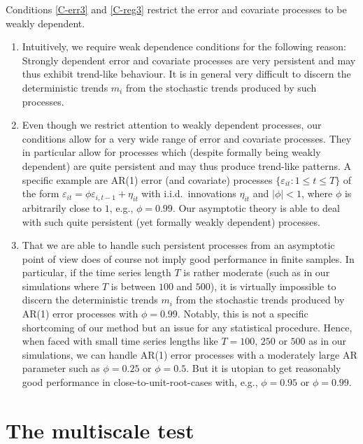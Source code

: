 \documentclass[12pt]{article}
\begin{document}
\begin{remark}
Conditions \ref{C-err3} and \ref{C-reg3} restrict the error and covariate processes to be weakly dependent.
\begin{enumerate}[label=(\roman*),leftmargin=0.9cm, itemsep=0pt, parsep=0pt, topsep=3pt]
\item Intuitively, we require weak dependence conditions for the following reason: Strongly dependent error and covariate processes are very persistent and may thus exhibit trend-like behaviour. It is in general very difficult to discern the deterministic trends $m_i$ from the stochastic trends produced by such processes.
\item Even though we restrict attention to weakly dependent processes, our conditions allow for a very wide range of error and covariate processes. They in particular allow for processes which (despite formally being weakly dependent) are quite persistent and may thus produce trend-like patterns. A specific example are AR(1) error (and covariate) processes $\{\varepsilon_{it}: 1 \le t \le T\}$ of the form $\varepsilon_{it} = \phi \varepsilon_{i,t-1} + \eta_{it}$ with i.i.d.\ innovations $\eta_{it}$ and $|\phi| < 1$, where $\phi$ is arbitrarily close to $1$, e.g., $\phi = 0.99$. Our asymptotic theory is able to deal with such quite persistent (yet formally weakly dependent) processes.
\item That we are able to handle such persistent processes from an asymptotic point of view does of course not imply good performance in finite samples. In particular, if the time series length $T$ is rather moderate (such as in our simulations where $T$ is between $100$ and $500$), it is virtually impossible to discern the deterministic trends $m_i$ from the stochastic trends produced by AR(1) error processes with $\phi=0.99$. Notably, this is not a specific shortcoming of our method but an issue for any statistical procedure. Hence, when faced with small time series lengths like $T=100$, $250$ or $500$ as in our simulations, we can handle AR(1) error processes with a moderately large AR parameter such as $\phi=0.25$ or $\phi= 0.5$. But it is utopian to get reasonably good performance in close-to-unit-root-cases with, e.g., $\phi=0.95$ or $\phi=0.99$.  
\end{enumerate}
\end{remark}
  


\section{The multiscale test}\label{sec:test}
\end{document}
